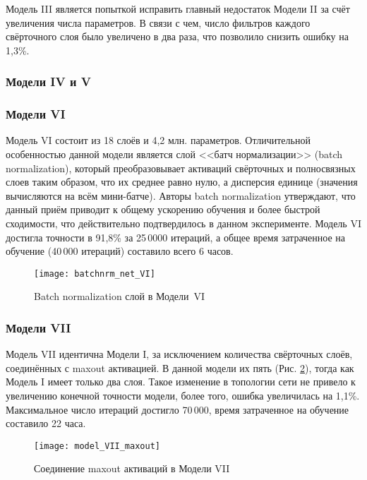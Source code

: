 Модель III является попыткой исправить главный недостаток Модели II за счёт увеличения числа параметров.
В связи с чем, число фильтров каждого свёрточного слоя было увеличено в два раза, что позволило снизить ошибку на 1,3\%.

\subsubsection{Модели IV и V}


\subsubsection{Модели VI}
Модель VI состоит из 18 слоёв и 4,2 млн. параметров. Отличительной особенностью данной модели является слой <<батч нормализации>>
(batch normalization), который преобразовывает активаций свёрточных и полносвязных слоев таким образом, что их среднее равно нулю, а
дисперсия единице (значения вычисляются на всём мини-батче). Авторы batch normalization \cite{DBLP:journals/corr/IoffeS15} утверждают,
что данный приём приводит к общему ускорению обучения и более быстрой сходимости, что действительно подтвердилось в данном эксперименте.
Модель VI достигла точности в 91,8\% за 25\,0000 итераций, а общее время затраченное на обучение (40\,000 итераций) составило всего 6 часов.
\begin{figure}[H]
    \centering
    \texttt{[image: batchnrm\_net\_VI]}
    \caption{Batch normalization слой в Модели~VI}
    \label{fig:model_VI_bnrm}
\end{figure}

\subsubsection{Модели VII}
Модель VII идентична Модели I, за исключением количества свёрточных слоёв, соединённых с maxout активацией. В данной модели их пять
(Рис. \ref*{fig:model_VII_maxout}), тогда как Модель I имеет только два слоя. Такое изменение в топологии сети не привело к 
увеличению конечной точности модели, более того, ошибка увеличилась на 1,1\%. Максимальное число итераций достигло 70\,000,
время затраченное на обучение составило 22 часа.
\begin{figure}[H]
    \centering
    \texttt{[image: model\_VII\_maxout]}
    \caption{Соединение maxout активаций в Модели VII}
    \label{fig:model_VII_maxout}
\end{figure}

